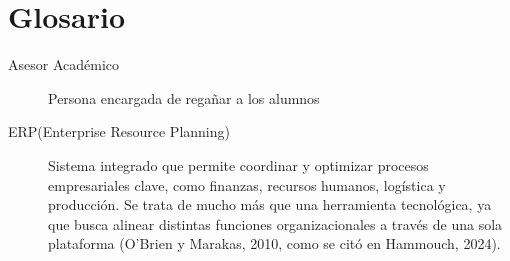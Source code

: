 \documentclass[12pt,letterpaper,spanish]{report}
\begin{document}
\newpage

\appendix

%







\newpage
\chapter{Glosario}

\begin{description}
  \item[Asesor Académico] Persona encargada de regañar a los alumnos
\end{description}

\begin{description}
  \item[ERP(Enterprise Resource Planning)]  Sistema integrado que permite coordinar y 
  optimizar procesos empresariales clave, como finanzas, recursos humanos, logística y producción. 
  Se trata de mucho más que una herramienta tecnológica, ya que busca alinear distintas funciones organizacionales a través de una sola plataforma 
  (O'Brien y Marakas, 2010, como se citó en Hammouch, 2024). %
\end{description}
\end{document}
